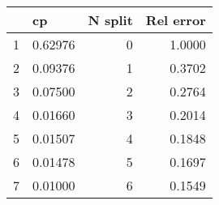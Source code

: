 \begin{tabular}{rrrr}
\toprule
      & \multicolumn{1}{l}{cp} & \multicolumn{1}{l}{N split} & \multicolumn{1}{l}{Rel error} \\
\midrule
1 & 0.62976 &      0&  1.0000 \\
2 & 0.09376  &     1&  0.3702 \\
3 & 0.07500  &     2&  0.2764 \\
4 & 0.01660  &     3&  0.2014 \\
5 & 0.01507  &     4&  0.1848 \\
6 & 0.01478  &     5&  0.1697 \\
7 & 0.01000  &     6&  0.1549 \\
\bottomrule
\end{tabular}%


